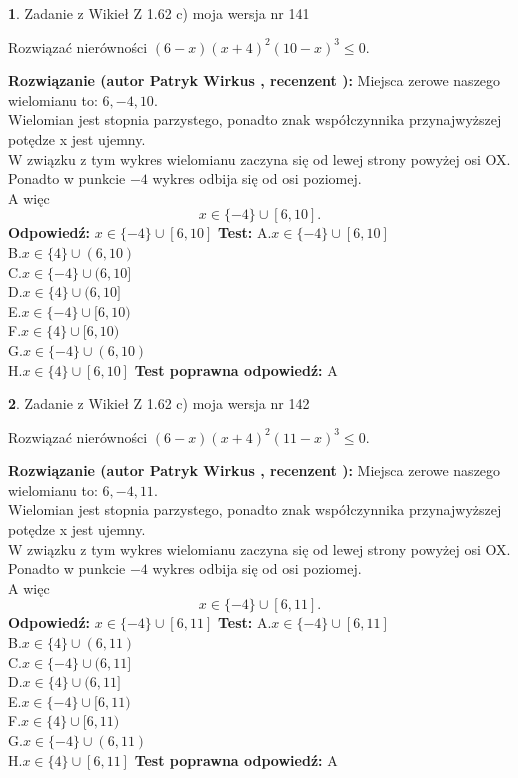 \documentclass[12pt, a4paper]{article}
\theoremstyle{definition} %
\newtheorem{zad}{}
\newcommand{\zadStart}[1]{\begin{zad}#1\newline}
\newcommand{\zadStop}{\end{zad}}
\newcommand{\rozwStart}[2]{\noindent \textbf{Rozwiązanie (autor #1 , recenzent #2): }\newline}
\newcommand{\rozwStop}{\newline}
\newcommand{\odpStart}{\noindent \textbf{Odpowiedź:}\newline}
\newcommand{\odpStop}{\newline}
\newcommand{\testStart}{\noindent \textbf{Test:}\newline}
\newcommand{\testStop}{\newline}
\newcommand{\kluczStart}{\noindent \textbf{Test poprawna odpowiedź:}\newline}
\newcommand{\kluczStop}{\newline}
\begin{document}
\zadStart{Zadanie z Wikieł Z 1.62 c) moja wersja nr 141}

Rozwiązać nierówności $(6-x)(x+4)^{2}(10-x)^{3}\le0$.
\zadStop
\rozwStart{Patryk Wirkus}{}
Miejsca zerowe naszego wielomianu to: $6, -4, 10$.\\
Wielomian jest stopnia parzystego, ponadto znak współczynnika przy\linebreak najwyższej potędze x jest ujemny.\\ W związku z tym wykres wielomianu zaczyna się od lewej strony powyżej osi OX.\\
Ponadto w punkcie $-4$ wykres odbija się od osi poziomej.\\
A więc $$x \in \{-4\} \cup [6,10].$$
\rozwStop
\odpStart
$x \in \{-4\} \cup [6,10]$
\odpStop
\testStart
A.$x \in \{-4\} \cup [6,10]$\\
B.$x \in \{4\} \cup (6,10)$\\
C.$x \in \{-4\} \cup (6,10]$\\
D.$x \in \{4\} \cup (6,10]$\\
E.$x \in \{-4\} \cup [6,10)$\\
F.$x \in \{4\} \cup [6,10)$\\
G.$x \in \{-4\} \cup (6,10)$\\
H.$x \in \{4\} \cup [6,10]$
\testStop
\kluczStart
A
\kluczStop



\zadStart{Zadanie z Wikieł Z 1.62 c) moja wersja nr 142}

Rozwiązać nierówności $(6-x)(x+4)^{2}(11-x)^{3}\le0$.
\zadStop
\rozwStart{Patryk Wirkus}{}
Miejsca zerowe naszego wielomianu to: $6, -4, 11$.\\
Wielomian jest stopnia parzystego, ponadto znak współczynnika przy\linebreak najwyższej potędze x jest ujemny.\\ W związku z tym wykres wielomianu zaczyna się od lewej strony powyżej osi OX.\\
Ponadto w punkcie $-4$ wykres odbija się od osi poziomej.\\
A więc $$x \in \{-4\} \cup [6,11].$$
\rozwStop
\odpStart
$x \in \{-4\} \cup [6,11]$
\odpStop
\testStart
A.$x \in \{-4\} \cup [6,11]$\\
B.$x \in \{4\} \cup (6,11)$\\
C.$x \in \{-4\} \cup (6,11]$\\
D.$x \in \{4\} \cup (6,11]$\\
E.$x \in \{-4\} \cup [6,11)$\\
F.$x \in \{4\} \cup [6,11)$\\
G.$x \in \{-4\} \cup (6,11)$\\
H.$x \in \{4\} \cup [6,11]$
\testStop
\kluczStart
A
\kluczStop
\end{document}
